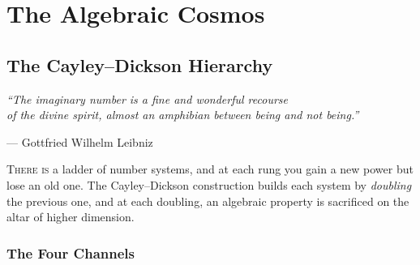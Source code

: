 \documentclass[11pt,twoside,openright]{book}
\theoremstyle{definition}
\begin{document}
\part{The Algebraic Cosmos}

\chapter{The Cayley--Dickson Hierarchy}
\label{ch:cayley-dickson}

\epigraph{\itshape ``The imaginary number is a fine and wonderful recourse\\
of the divine spirit, almost an amphibian between being and not being.''}
{--- Gottfried Wilhelm Leibniz}

\lettrine[lines=3]{T}{here is} a ladder of number systems, and at each
rung you gain a new power but lose an old one. The Cayley--Dickson
construction builds each system by \emph{doubling} the previous one,
and at each doubling, an algebraic property is sacrificed on the altar
of higher dimension.

\section{The Four Channels}
\end{document}
